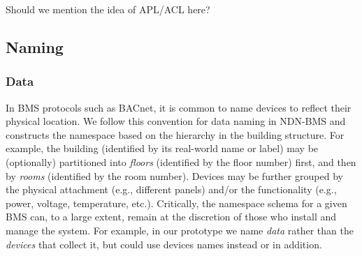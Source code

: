 Should we mention the idea of APL/ACL here?






\subsection{Naming}
\subsubsection{Data}


In BMS protocols such as BACnet, it is common to name devices to reflect their physical location.
We follow this convention for data naming in NDN-BMS and constructs the namespace based on the hierarchy in the building structure.   
For example, the building (identified by its real-world name or label) may be (optionally) partitioned into \emph{floors} (identified by the floor number) first, and then by \emph{rooms} (identified by the room number). 
Devices may be further grouped by the physical attachment (e.g., different panels) and/or the functionality (e.g., power, voltage, temperature, etc.). Critically, the namespace schema for a given BMS can, to a large extent, remain at the discretion of those who install and manage the system. For example, in our prototype we name \textit{data} rather than the \textit{devices} that collect it, but could use devices names instead or in addition. 

